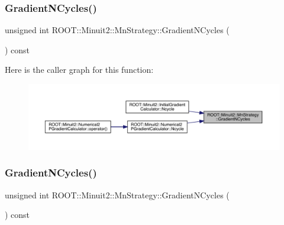\subsubsection{\texorpdfstring{GradientNCycles()}{GradientNCycles()}\hspace{0.1cm}{\footnotesize\ttfamily [1/2]}}
{\footnotesize\ttfamily unsigned int R\+O\+O\+T\+::\+Minuit2\+::\+Mn\+Strategy\+::\+Gradient\+N\+Cycles (\begin{DoxyParamCaption}{ }\end{DoxyParamCaption}) const\hspace{0.3cm}{\ttfamily [inline]}}

Here is the caller graph for this function\+:\nopagebreak
\begin{figure}[H]
\begin{center}
\leavevmode
\includegraphics[width=350pt]{da/de4/classROOT_1_1Minuit2_1_1MnStrategy_ab2f1980e3eb9f9b0818cf6f8c24b6311_icgraph}
\end{center}
\end{figure}
\mbox{\label{classROOT_1_1Minuit2_1_1MnStrategy_ab2f1980e3eb9f9b0818cf6f8c24b6311}} 
\subsubsection{\texorpdfstring{GradientNCycles()}{GradientNCycles()}\hspace{0.1cm}{\footnotesize\ttfamily [2/2]}}
{\footnotesize\ttfamily unsigned int R\+O\+O\+T\+::\+Minuit2\+::\+Mn\+Strategy\+::\+Gradient\+N\+Cycles (\begin{DoxyParamCaption}{ }\end{DoxyParamCaption}) const\hspace{0.3cm}{\ttfamily [inline]}}

\mbox{\label{classROOT_1_1Minuit2_1_1MnStrategy_a5352522cca1056c242a309d29e28e3c2}} 
